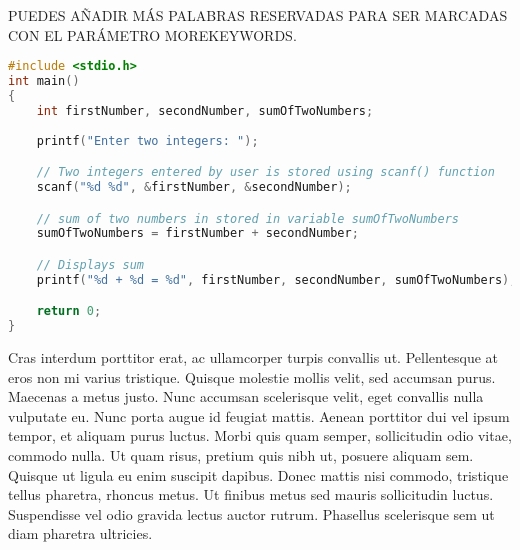PUEDES AÑADIR MÁS PALABRAS RESERVADAS PARA SER MARCADAS CON EL PARÁMETRO MOREKEYWORDS.

\begin{lstlisting}[language=C,morekeywords={scanf, printf},style=no-color ,caption=Ejercio de prueba \cite{web:vimgolf}]
#include <stdio.h>
int main()
{
    int firstNumber, secondNumber, sumOfTwoNumbers;
    
    printf("Enter two integers: ");

    // Two integers entered by user is stored using scanf() function
    scanf("%d %d", &firstNumber, &secondNumber);

    // sum of two numbers in stored in variable sumOfTwoNumbers
    sumOfTwoNumbers = firstNumber + secondNumber;

    // Displays sum      
    printf("%d + %d = %d", firstNumber, secondNumber, sumOfTwoNumbers);

    return 0;
}
\end{lstlisting}



Cras interdum porttitor erat, ac ullamcorper turpis convallis ut. Pellentesque at eros non mi varius tristique. Quisque molestie mollis velit, sed accumsan purus. Maecenas a metus justo. Nunc accumsan scelerisque velit, eget convallis nulla vulputate eu. Nunc porta augue id feugiat mattis. Aenean porttitor dui vel ipsum tempor, et aliquam purus luctus. Morbi quis quam semper, sollicitudin odio vitae, commodo nulla. Ut quam risus, pretium quis nibh ut, posuere aliquam sem. Quisque ut ligula eu enim suscipit dapibus. Donec mattis nisi commodo, tristique tellus pharetra, rhoncus metus. Ut finibus metus sed mauris sollicitudin luctus. Suspendisse vel odio gravida lectus auctor rutrum. Phasellus scelerisque sem ut diam pharetra ultricies.

